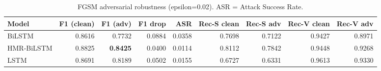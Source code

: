 \begin{table}[h!]
\centering
\caption{FGSM adversarial robustness (epsilon=0.02). ASR = Attack Success Rate.}
\label{tab:fgsm_robust}
\begin{tabular}{lrrrrrrrr}
\toprule
Model & F1 (clean) & F1 (adv) & F1 drop & ASR & Rec-S clean & Rec-S adv & Rec-V clean & Rec-V adv \\
\midrule
BiLSTM & 0.8616 & 0.7732 & 0.0884 & 0.0358 & 0.7698 & 0.7122 & 0.9427 & 0.8971 \\
HMR-BiLSTM & 0.8825 & \textbf{0.8425} & 0.0400 & 0.0114 & 0.8112 & 0.7842 & 0.9448 & 0.9268 \\
LSTM & 0.8691 & 0.8189 & 0.0502 & 0.0155 & 0.6727 & 0.6331 & 0.9613 & 0.9330 \\
\bottomrule
\end{tabular}
\end{table}
